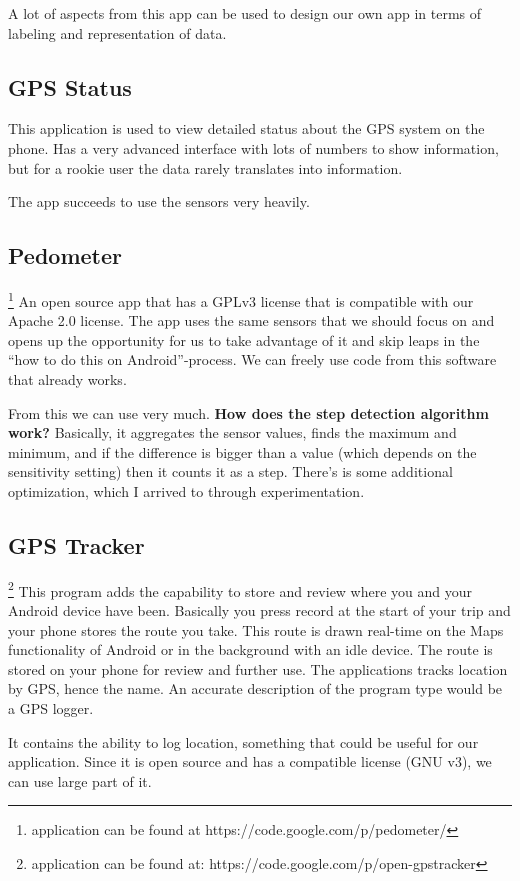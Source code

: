 A lot of aspects from this app can be used to design our own app in terms of labeling and representation of data.

\subsection{GPS Status}
This application is used to view detailed status about the GPS system on the phone. Has a very advanced interface with lots of numbers to show information, but for a rookie user the data rarely translates into information.

The app succeeds to use the sensors very heavily.

\subsection{Pedometer}\footnote{application can be found at https://code.google.com/p/pedometer/} 
An open source app that has a GPLv3 license that is compatible with our Apache 2.0 license. The app uses the same sensors that we should focus on and opens up the opportunity for us to take advantage of it and skip leaps in the “how to do this on Android”-process. We can freely use code from this software that already works.

From this we can use very much.
\textbf{How does the step detection algorithm work?}
Basically, it aggregates the sensor values, finds the maximum and minimum, and if the difference is bigger than a value (which depends on the sensitivity setting) then it counts it as a step. There's is some additional optimization, which I arrived to through experimentation.

\subsection{GPS Tracker}\footnote{application can be found at: https://code.google.com/p/open-gpstracker}
This program adds the capability to store and review where you and your Android device have been. Basically you press record at the start of your trip and your phone stores the route you take. This route is drawn real-time on the Maps functionality of Android or in the background with an idle device. The route is stored on your phone for review and further use. The applications tracks location by GPS, hence the name. An accurate description of the program type would be a GPS logger.

It contains the ability to log location, something that could be useful for our application. Since it is open source and has a compatible license (GNU v3), we can use large part of it.

